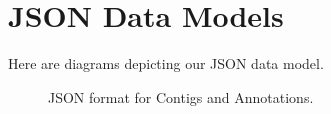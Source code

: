 \documentclass[10pt, conference, compsocconf]{IEEEtran}
\begin{document}




\onecolumn
\appendices

\section{JSON Data Models}\label{sec:data_models}
\centering
Here are diagrams depicting our JSON data model.

\begin{figure}[h]
   \centering
   \caption{JSON format for Contigs and Annotations.}
\end{figure}
\end{document}
